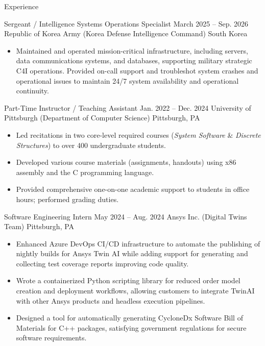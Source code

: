 \begin{resumesection}{Experience}
	\begin{experience}
		{Sergeant / Intelligence Systems Operations Specialist}
		{March 2025 – Sep. 2026}
		{Republic of Korea Army (Korea Defense Intelligence Command)}
		{South Korea}
		\vspace{-\parskip}
		\begin{itemize}
			\item Maintained and operated mission-critical infrastructure, including servers, data communications systems, and databases, supporting military strategic C4I operations.
			      Provided on-call support and troubleshot system crashes and operational issues to maintain 24/7 system availability and operational continuity.
		\end{itemize}
	\end{experience}

	\begin{experience}
		{Part-Time Instructor / Teaching Assistant}
		{Jan. 2022 – Dec. 2024}
		{University of Pittsburgh (Department of Computer Science)}
		{Pittsburgh, PA}
		\vspace{-\parskip}
		\begin{itemize}
			\item Led recitations in two core-level required courses (\textit{System Software} \& \textit{Discrete Structures}) to over 400 undergraduate students.
			\item Developed various course materials (assignments, handouts) using x86 assembly and the C programming language.
			\item Provided comprehensive one-on-one academic support to students in office hours; performed grading duties.
		\end{itemize}
	\end{experience}

	\begin{experience}
		{Software Engineering Intern}
		{May 2024 – Aug. 2024}
		{Ansys Inc. (Digital Twins Team)}
		{Pittsburgh, PA}
		\vspace{-\parskip}
		\begin{itemize}
			\item Enhanced Azure DevOps CI/CD infrastructure to automate the publishing of nightly builds for Ansys Twin AI while adding support for generating and collecting test coverage reports improving code quality.
			\item Wrote a containerized Python scripting library for reduced order model creation and deployment workflows, allowing customers to integrate TwinAI with other Ansys products and headless execution pipelines.
			\item Designed a tool for automatically generating CycloneDx Software Bill of Materials for C++ packages, satisfying government regulations for secure software requirements.
		\end{itemize}
	\end{experience}
\end{resumesection}
